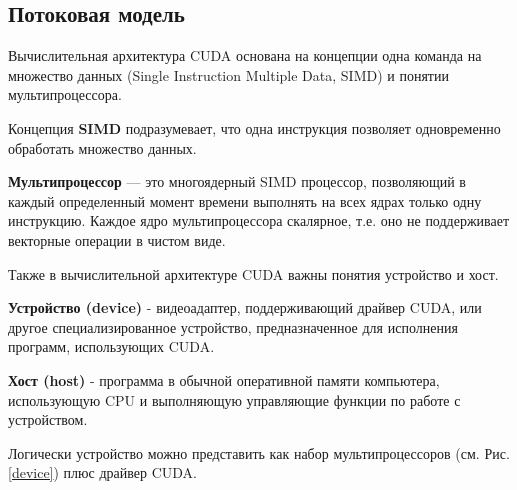 \documentclass[a4paper, final]{article}
\begin{document}
    \subsection{Потоковая модель}
    Вычислительная архитектура CUDA основана на концепции одна команда на множество данных (Single Instruction Multiple Data, SIMD) и понятии мультипроцессора.
    
    Концепция \textbf{SIMD} подразумевает, что одна инструкция позволяет одновременно обработать множество данных. 
    
    \textbf{Мультипроцессор} — это многоядерный SIMD процессор, позволяющий в каждый определенный момент времени выполнять на всех ядрах только одну инструкцию. Каждое ядро мультипроцессора скалярное, т.е. оно не поддерживает векторные операции в чистом виде.
    
    Также в вычислительной архитектуре CUDA важны понятия устройство и хост.
    
    \textbf{Устройство (device)} - видеоадаптер, поддерживающий драйвер CUDA, или другое специализированное устройство, предназначенное для исполнения программ, использующих CUDA.
    
    
    \textbf{Хост (host)} - программа в обычной оперативной памяти компьютера, использующую CPU и выполняющую управляющие функции по работе с устройством.
    
    Логически устройство можно представить как набор мультипроцессоров (см. Рис. \ref{device}) плюс драйвер CUDA.
    
\end{document}
